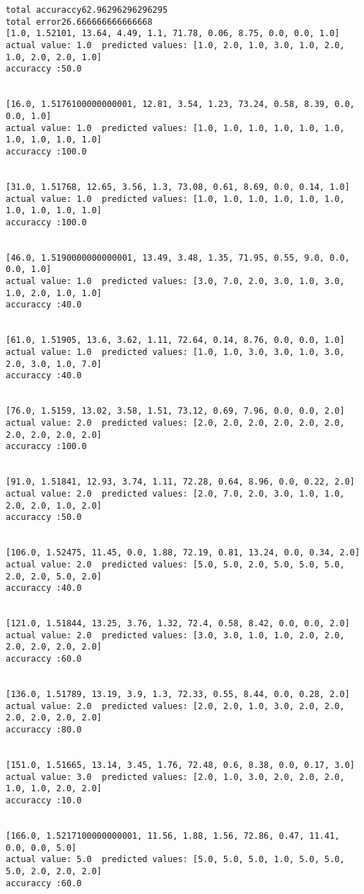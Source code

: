 \documentclass[11pt]{article}
\begin{document}
\begin{Verbatim}[commandchars=\\\{\}]
total accuraccy62.96296296296295
total error26.666666666666668
[1.0, 1.52101, 13.64, 4.49, 1.1, 71.78, 0.06, 8.75, 0.0, 0.0, 1.0]
actual value: 1.0  predicted values: [1.0, 2.0, 1.0, 3.0, 1.0, 2.0, 1.0, 2.0, 2.0, 1.0]
accuraccy :50.0


[16.0, 1.5176100000000001, 12.81, 3.54, 1.23, 73.24, 0.58, 8.39, 0.0, 0.0, 1.0]
actual value: 1.0  predicted values: [1.0, 1.0, 1.0, 1.0, 1.0, 1.0, 1.0, 1.0, 1.0, 1.0]
accuraccy :100.0


[31.0, 1.51768, 12.65, 3.56, 1.3, 73.08, 0.61, 8.69, 0.0, 0.14, 1.0]
actual value: 1.0  predicted values: [1.0, 1.0, 1.0, 1.0, 1.0, 1.0, 1.0, 1.0, 1.0, 1.0]
accuraccy :100.0


[46.0, 1.5190000000000001, 13.49, 3.48, 1.35, 71.95, 0.55, 9.0, 0.0, 0.0, 1.0]
actual value: 1.0  predicted values: [3.0, 7.0, 2.0, 3.0, 1.0, 3.0, 1.0, 2.0, 1.0, 1.0]
accuraccy :40.0


[61.0, 1.51905, 13.6, 3.62, 1.11, 72.64, 0.14, 8.76, 0.0, 0.0, 1.0]
actual value: 1.0  predicted values: [1.0, 1.0, 3.0, 3.0, 1.0, 3.0, 2.0, 3.0, 1.0, 7.0]
accuraccy :40.0


[76.0, 1.5159, 13.02, 3.58, 1.51, 73.12, 0.69, 7.96, 0.0, 0.0, 2.0]
actual value: 2.0  predicted values: [2.0, 2.0, 2.0, 2.0, 2.0, 2.0, 2.0, 2.0, 2.0, 2.0]
accuraccy :100.0


[91.0, 1.51841, 12.93, 3.74, 1.11, 72.28, 0.64, 8.96, 0.0, 0.22, 2.0]
actual value: 2.0  predicted values: [2.0, 7.0, 2.0, 3.0, 1.0, 1.0, 2.0, 2.0, 1.0, 2.0]
accuraccy :50.0


[106.0, 1.52475, 11.45, 0.0, 1.88, 72.19, 0.81, 13.24, 0.0, 0.34, 2.0]
actual value: 2.0  predicted values: [5.0, 5.0, 2.0, 5.0, 5.0, 5.0, 2.0, 2.0, 5.0, 2.0]
accuraccy :40.0


[121.0, 1.51844, 13.25, 3.76, 1.32, 72.4, 0.58, 8.42, 0.0, 0.0, 2.0]
actual value: 2.0  predicted values: [3.0, 3.0, 1.0, 1.0, 2.0, 2.0, 2.0, 2.0, 2.0, 2.0]
accuraccy :60.0


[136.0, 1.51789, 13.19, 3.9, 1.3, 72.33, 0.55, 8.44, 0.0, 0.28, 2.0]
actual value: 2.0  predicted values: [2.0, 2.0, 1.0, 3.0, 2.0, 2.0, 2.0, 2.0, 2.0, 2.0]
accuraccy :80.0


[151.0, 1.51665, 13.14, 3.45, 1.76, 72.48, 0.6, 8.38, 0.0, 0.17, 3.0]
actual value: 3.0  predicted values: [2.0, 1.0, 3.0, 2.0, 2.0, 2.0, 1.0, 1.0, 2.0, 2.0]
accuraccy :10.0


[166.0, 1.5217100000000001, 11.56, 1.88, 1.56, 72.86, 0.47, 11.41, 0.0, 0.0, 5.0]
actual value: 5.0  predicted values: [5.0, 5.0, 5.0, 1.0, 5.0, 5.0, 5.0, 2.0, 2.0, 2.0]
accuraccy :60.0



\end{Verbatim}
\end{document}
